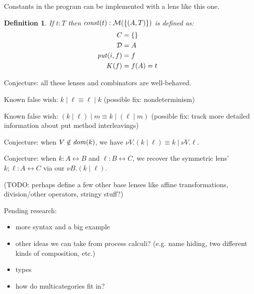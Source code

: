 \documentclass{article}
\newcommand{\lens}{\leftrightarrow}
\newtheorem{definition}{Definition}
\begin{document}
Constants in the program can be implemented with a lens like this one.

\newcommand{\const}{\mathit{const}}
\begin{definition}
    If $t : T$ then $\const(t) : \mlens{\{(A,T)\}}$ is defined as:
    \begin{align*}
        C &= \{\} \\
        \mathcal D &= A \\
        \mathit{put}(i,f) &= f \\
        K(f) &= f(A) = t
    \end{align*}
\end{definition}

Conjecture: all these lenses and combinators are well-behaved.

Known false wish: $k \mid \ell \equiv \ell \mid k$ (possible fix:
nondeterminism)

Known false wish: $(k \mid \ell) \mid m \equiv k \mid (\ell \mid m)$
(possible fix: track more detailed information about put method
interleavings)

Conjecture: when $V \notin \mathit{dom}(k)$, we have $\nu V. (k \mid \ell) \equiv
k \mid \nu V. \ell$.

Conjecture: when $k : A \lens B$ and $\ell : B \lens C$, we recover the
symmetric lens' $k;\ell : A \lens C$ via our $\nu B.(k \mid \ell)$.

(TODO: perhaps define a few other base lenses like affine transformations,
division/other operators, stringy stuff?)

Pending research:
\begin{itemize}
    \item more syntax and a big example
    \item other ideas we can take from process calculi? (e.g. name hiding,
        two different kinds of composition, etc.)
    \item types
    \item how do multicategories fit in?
\end{itemize}
\end{document}
